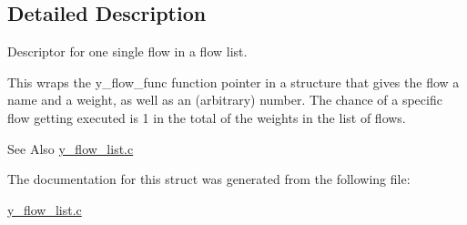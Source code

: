 \subsection{Detailed Description}
Descriptor for one single flow in a flow list. 

This wraps the y\-\_\-flow\-\_\-func function pointer in a structure that gives the flow a name and a weight, as well as an (arbitrary) number. The chance of a specific flow getting executed is 1 in the total of the weights in the list of flows.

\begin{DoxySeeAlso}{See Also}
\hyperlink{y__flow__list_8c}{y\-\_\-flow\-\_\-list.\-c} 
\end{DoxySeeAlso}


The documentation for this struct was generated from the following file\-:\begin{DoxyCompactItemize}
\item 
\hyperlink{y__flow__list_8c}{y\-\_\-flow\-\_\-list.\-c}\end{DoxyCompactItemize}
